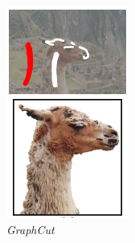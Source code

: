 \begin{figure}[H]
\begin{subfigure}{0.3\textwidth}
      \includegraphics[width=\textwidth]{gambar/gambar-2_5(e).png}
      \caption{\emph{GraphCut}}
    \end{subfigure}   
    \begin{subfigure}{0.3\textwidth}
      \centering{}

\end{subfigure}
\end{figure}

